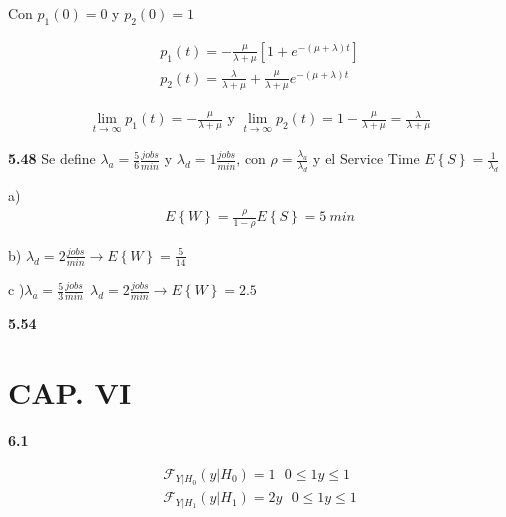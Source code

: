 Con $p_1(0) = 0$ y $p_2(0) = 1$

\begin{equation*}
\begin{gathered}
	p_1(t) = -\frac{\mu}{\lambda + \mu} \left[ 1 + e^{-\left( \mu + \lambda \right) t} \right]	\\
	p_2(t) = \frac{\lambda}{\lambda + \mu} + \frac{\mu}{\lambda + \mu} e^{-\left( \mu + \lambda \right) t}
\end{gathered}
\end{equation*}

\begin{equation*}
\begin{gathered}
	\lim_{t \to \infty} p_1(t) = -\frac{\mu}{\lambda + \mu} \text{ y } \lim_{t \to \infty} p_2(t) = 1 - \frac{\mu}{\lambda + \mu} = \frac{\lambda}{\lambda + \mu}
\end{gathered}
\end{equation*}


\vspace{1cm}

\textbf{5.48} Se define $\lambda_a = \frac{5}{6} \frac{jobs}{min}$ y $\lambda_d = 1 \frac{jobs}{min}$, con $\rho = \frac{\lambda_a}{\lambda_d}$ y el Service Time $E \left\lbrace S \right\rbrace = \frac{1}{\lambda_d}$

a)
\begin{equation*}
\begin{split}
	E \left\lbrace W \right\rbrace = \frac{\rho}{1 - \rho}	E \left\lbrace S \right\rbrace = 5 \ min
\end{split}
\end{equation*}

b) $\lambda_d = 2 \frac{jobs}{min} \rightarrow E \left\lbrace W \right\rbrace = \frac{5}{14} $

c )$\lambda_a = \frac{5}{3} \frac{jobs}{min} \ \ \lambda_d = 2 \frac{jobs}{min} \rightarrow E \left\lbrace W \right\rbrace = 2.5 $

\vspace{1cm}

\textbf{5.54}


\newpage

\section*{CAP. VI}

\textbf{6.1}

\begin{equation*}
\begin{gathered}
	\mathcal{F}_{Y|H_0}(y|H_0) = 1 \ \ \ 0 \le1 y \leq 1	\\
	\mathcal{F}_{Y|H_1}(y|H_1) = 2y \ \ \ 0 \le1 y \leq 1
\end{gathered}
\end{equation*}


